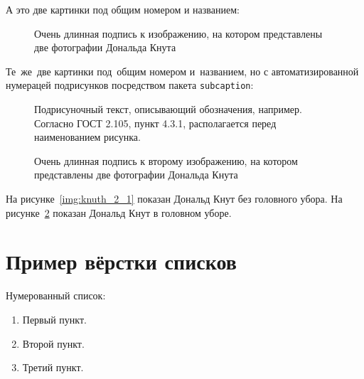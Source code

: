 А это две картинки под общим номером и названием:
\begin{figure}[ht]
  \begin{minipage}[ht]{0.49\linewidth}
  \end{minipage}
  \hfill
  \begin{minipage}[ht]{0.49\linewidth}
  \end{minipage}
  \caption{Очень длинная подпись к изображению, на котором представлены две фотографии Дональда Кнута}
  \label{img:knuth}  
\end{figure}

Те~же~две картинки под~общим номером и~названием, но с автоматизированной нумерацей подрисунков посредством пакета \verb|subcaption|:
\begin{figure}[ht]

    Подрисуночный текст, описывающий обозначения, например. Согласно ГОСТ 2.105, пункт 4.3.1, располагается перед наименованием рисунка.
    \caption{Очень длинная подпись к второму изображению, на котором представлены две фотографии Дональда Кнута} %
    \label{img:knuth_2}
\end{figure}


На рисунке~\ref{img:knuth_2_1} показан Дональд Кнут без головного убора. На рисунке~\ref{img:knuth_2}  показан Дональд Кнут в головном уборе.

\section{Пример вёрстки списков} \label{sect2_3}

\noindent Нумерованный список:
\begin{enumerate}
  \item Первый пункт.
  \item Второй пункт.
  \item Третий пункт.
\end{enumerate}

